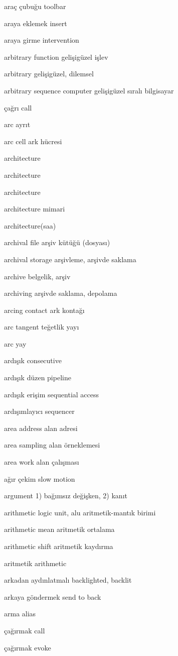 \documentclass[12pt,fleqn]{article}\usepackage{../../common}
\begin{document}
araç çubuğu toolbar

araya eklemek insert

araya girme intervention

arbitrary function gelişigüzel işlev

arbitrary gelişigüzel, dilemsel

arbitrary sequence computer gelişigüzel sıralı bilgisayar

çağrı call

arc ayrıt

arc cell ark hücresi

architecture

architecture

architecture

architecture mimari

architecture(saa)

archival file arşiv kütüğü (dosyası)

archival storage arşivleme, arşivde saklama

archive belgelik, arşiv

archiving arşivde saklama, depolama

arcing contact ark kontağı

arc tangent teğetlik yayı

arc yay

ardışık consecutive

ardışık düzen pipeline

ardışık erişim sequential access

ardışımlayıcı sequencer

area address alan adresi

area sampling alan örneklemesi

area work alan çalışması

ağır çekim slow motion

argument 1) bağımsız değişken, 2) kanıt

arithmetic logic unit, alu aritmetik-mantık birimi

arithmetic mean aritmetik ortalama

arithmetic shift aritmetik kaydırma

aritmetik arithmetic

arkadan aydınlatmalı backlighted, backlit

arkaya göndermek send to back

arma alias

çağırmak call

çağırmak evoke
\end{document}

